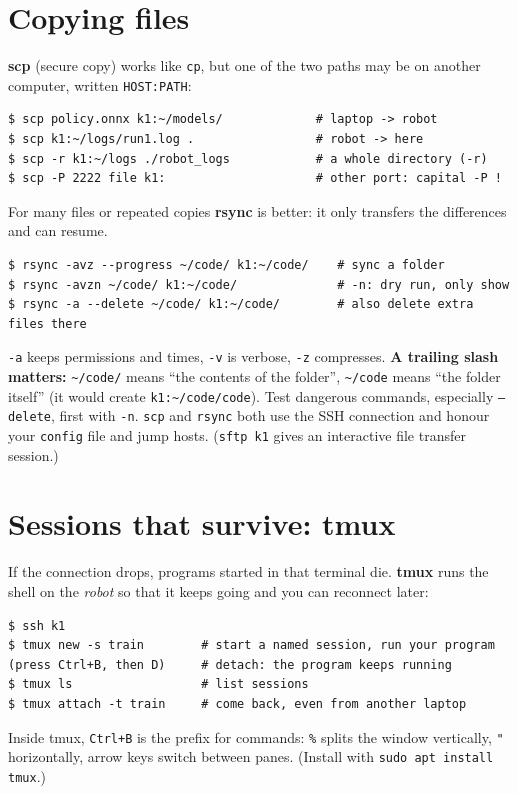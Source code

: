 \section*{Copying files}
\textbf{scp} (secure copy) works like \texttt{cp}, but one of the two paths may be on another computer, written \verb|HOST:PATH|:
\begin{verbatim}
$ scp policy.onnx k1:~/models/             # laptop -> robot
$ scp k1:~/logs/run1.log .                 # robot -> here
$ scp -r k1:~/logs ./robot_logs            # a whole directory (-r)
$ scp -P 2222 file k1:                     # other port: capital -P !
\end{verbatim}
For many files or repeated copies \textbf{rsync} is better: it only transfers the differences and can resume.
\begin{verbatim}
$ rsync -avz --progress ~/code/ k1:~/code/    # sync a folder
$ rsync -avzn ~/code/ k1:~/code/              # -n: dry run, only show
$ rsync -a --delete ~/code/ k1:~/code/        # also delete extra files there
\end{verbatim}
\texttt{-a} keeps permissions and times, \texttt{-v} is verbose, \texttt{-z} compresses. \textbf{A trailing slash matters:} \verb|~/code/| means ``the contents of the folder'', \verb|~/code| means ``the folder itself'' (it would create \texttt{k1:\textasciitilde/code/code}). Test dangerous commands, especially \texttt{--delete}, first with \texttt{-n}. \texttt{scp} and \texttt{rsync} both use the SSH connection and honour your \texttt{config} file and jump hosts. (\texttt{sftp k1} gives an interactive file transfer session.)

\section*{Sessions that survive: tmux}
If the connection drops, programs started in that terminal die. \textbf{tmux} runs the shell on the \emph{robot} so that it keeps going and you can reconnect later:
\begin{verbatim}
$ ssh k1
$ tmux new -s train        # start a named session, run your program
(press Ctrl+B, then D)     # detach: the program keeps running
$ tmux ls                  # list sessions
$ tmux attach -t train     # come back, even from another laptop
\end{verbatim}
Inside tmux, \texttt{Ctrl+B} is the prefix for commands: \texttt{\%} splits the window vertically, \texttt{"} horizontally, arrow keys switch between panes. (Install with \verb|sudo apt install tmux|.)

